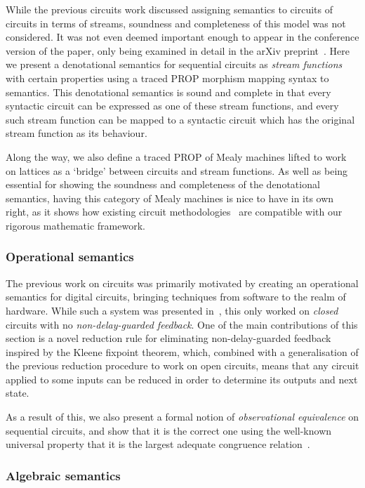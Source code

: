 While the previous circuits work discussed assigning semantics to circuits
of circuits in terms of streams, soundness and completeness of this model was
not considered.
It was not even deemed important enough to appear in the conference version of
the paper, only being examined in detail in the arXiv
preprint~\cite{ghica2017diagrammatica}.
Here we present a denotational semantics for sequential circuits as
\emph{stream functions} with certain properties using a traced PROP morphism
mapping syntax to semantics.
This denotational semantics is sound and complete in that every syntactic
circuit can be expressed as one of these stream functions, and every such stream
function can be mapped to a syntactic circuit which has the original stream
function as its behaviour.

Along the way, we also define a traced PROP of Mealy machines lifted to work on
lattices as a `bridge' between circuits and stream functions.
As well as being essential for showing the soundness and completeness of the
denotational semantics, having this category of Mealy machines is nice to have
in its own right, as it shows how existing circuit
methodologies~\cite{kohavi2009switching} are compatible with our rigorous
mathematic framework.

\subsubsection{Operational semantics}

The previous work on circuits was primarily motivated by creating an operational
semantics for digital circuits, bringing techniques from software to the realm
of hardware.
While such a system was presented in~\cite{ghica2017diagrammatic}, this only
worked on \emph{closed} circuits with no \emph{non-delay-guarded feedback}.
One of the main contributions of this section is a novel reduction rule for
eliminating non-delay-guarded feedback inspired by the Kleene fixpoint theorem,
which, combined with a generalisation of the previous reduction procedure to
work on open circuits, means that any circuit applied to some inputs can be
reduced in order to determine its outputs and next state.

As a result of this, we also present a formal notion of
\emph{observational equivalence} on sequential circuits, and show that it is the
correct one using the well-known universal property that it is the largest
adequate congruence relation~\cite{gordon1998operational}.

\subsubsection{Algebraic semantics}

